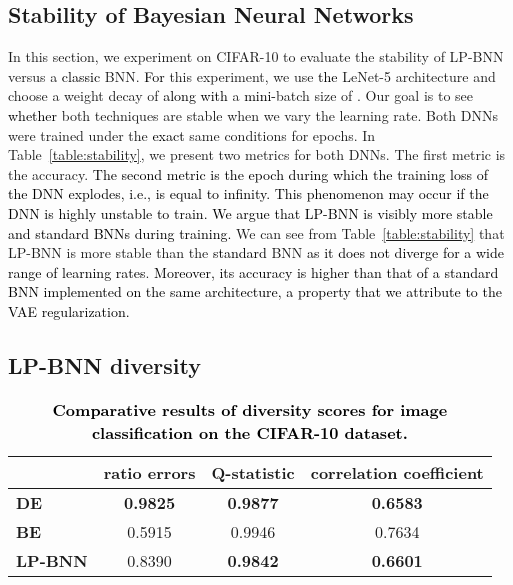 \documentclass[10pt,twocolumn,letterpaper]{article}
\newcommand\emi{\textcolor{black}}
\newcommand\Gianni{\textcolor{black}}
\newcommand{\ab}[1]{\textcolor{black}{#1}}
\begin{document}
\subsection{Stability of Bayesian Neural Networks}
In this section, we experiment on CIFAR-10 to evaluate the stability of LP-BNN versus a 
\ab{classic} BNN. \emi{For} this experiment, we use \emi{the} LeNet-5 architecture and choose a weight decay of   \emi{along with} a \ab{mini-}batch size of . Our goal is to see \emi{whether} both techniques are stable when we vary the learning rate.  Both DNNs were trained under the \Gianni{exact} same conditions for  epochs.
In Table~\ref{table:stability}, we present two metrics for both DNNs. The first metric is the accuracy.  \Gianni{The second metric is the epoch \emi{during which} the training loss of the DNN \ab{explodes, i.e.,} is equal to infinity. This phenomenon may occur if the DNN is highly unstable to train. 
}
\ab{We argue that LP-BNN is visibly more stable and standard BNNs during training.}
We can see from Table~\ref{table:stability} that LP-BNN is more stable than the 
\ab{standard} BNN \emi{as it does not diverge for a wide range of learning rates}. \emi{Moreover, its accuracy is higher than that of a standard BNN implemented on the same architecture, a property that we attribute to the VAE regularization.} 




\subsection{LP-BNN diversity}


\begin{table}[t!]
\renewcommand{\figurename}{Table}
\renewcommand{\captionfont}{\small}
\begin{center}
\scalebox{0.75}
{
\begin{tabular}{l|c|c|c}
\toprule
 &   \textbf{ratio errors  }  & \textbf{Q-statistic  }   & \textbf{correlation coefficient  } \\ 
\midrule
\textbf{DE}        &\textbf{0.9825 }     & \textbf{0.9877 }   & \textbf{0.6583} \\ 
\midrule
\textbf{BE}         &0.5915     & 0.9946     & 0.7634  \\ 
 \midrule
\textbf{LP-BNN }      & 0.8390     & \textbf{0.9842}    & \textbf{0.6601 }      \\ 
\bottomrule
\end{tabular}
}
\end{center}
\caption{\Gianni{\textbf{Comparative results of diversity \ab{scores} for image classification 
\ab{on the CIFAR-10 dataset.}
}}
}
\label{table:diversity}
\vspace{-3pt}
\end{table}
\end{document}
